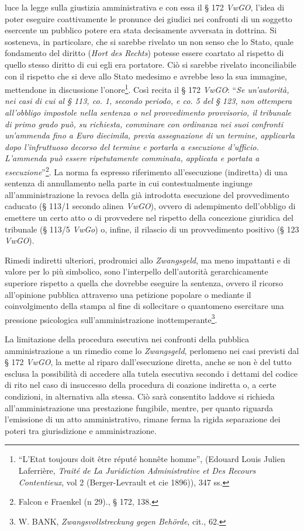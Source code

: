 \documentclass[12pt,it,a4paper,]{report}
\begin{document}
luce la legge sulla giustizia amministrativa e con essa il § 172
\emph{VwGO}, l'idea di poter eseguire coattivamente le pronunce dei
giudici nei confronti di un soggetto esercente un pubblico potere era
stata decisamente avversata in dottrina. Si sosteneva, in particolare,
che si sarebbe rivelato un non senso che lo Stato, quale fondamento del
diritto (\emph{Hort des Rechts}) potesse essere coartato al rispetto di
quello stesso diritto di cui egli era portatore. Ciò si sarebbe rivelato
inconciliabile con il rispetto che si deve allo Stato medesimo e avrebbe
leso la sua immagine, mettendone in discussione l'onore\footnote{``L'Etat
  toujours doit être réputé honnête homme'', (Edouard Louis Julien
  Laferrière, \emph{Traité de La Juridiction Administrative et Des
  Recours Contentieux}, vol 2 ({Berger-Levrault et cie} 1896)), 347 ss.}.
Così recita il § 172 \emph{VwGO}: ``\emph{Se un'autorità, nei casi di
cui al § 113, co. 1, secondo periodo, e co. 5 del § 123, non ottempera
all'obbligo impostole nella sentenza o nel provvedimento provvisorio, il
tribunale di primo grado può, su richiesta, comminare con ordinanza nei
suoi confronti un'ammenda fino a Euro diecimila, previa assegnazione di
un termine, applicarla dopo l'infruttuoso decorso del termine e portarla
a esecuzione d'ufficio. L'ammenda può essere ripetutamente comminata,
applicata e portata a esecuzione}''\footnote{{Falcon e Fraenkel (n
  29).}, § 172, 138.}. La norma fa espresso riferimento all'esecuzione
(indiretta) di una sentenza di annullamento nella parte in cui
contestualmente ingiunge all'amministrazione la revoca della già
introdotta esecuzione del provvedimento caducato (§ 113/1 secondo alinea
\emph{VwGO}), ovvero di adempimento dell'obbligo di emettere un certo
atto o di provvedere nel rispetto della concezione giuridica del
tribunale (§ 113/5 \emph{VwGo}) o, infine, il rilascio di un
provvedimento positivo (§ 123 \emph{VwGO}).

Rimedi indiretti ulteriori, prodromici allo \emph{Zwangsgeld}, ma meno
impattanti e di valore per lo più simbolico, sono l'interpello
dell'autorità gerarchicamente superiore rispetto a quella che dovrebbe
eseguire la sentenza, ovvero il ricorso all'opinione pubblica attraverso
una petizione popolare o mediante il coinvolgimento della stampa al fine
di sollecitare o quantomeno esercitare una pressione psicologica
sull'amministrazione inottemperante\footnote{W. BANK,
  \emph{Zwangsvollstreckung gegen Behörde}, cit., 62.}.

La limitazione della procedura esecutiva nei confronti della pubblica
amministrazione a un rimedio come lo \emph{Zwangsgeld}, perlomeno nei
casi previsti dal § 172 \emph{VwGO}, la mette al riparo dall'esecuzione
diretta, anche se non è del tutto esclusa la possibilità di accedere
alla tutela esecutiva secondo i dettami del codice di rito nel caso di
insuccesso della procedura di coazione indiretta o, a certe condizioni,
in alternativa alla stessa. Ciò sarà consentito laddove si richieda
all'amministrazione una prestazione fungibile, mentre, per quanto
riguarda l'emissione di un atto amministrativo, rimane ferma la rigida
separazione dei poteri tra giurisdizione e amministrazione.
\end{document}

